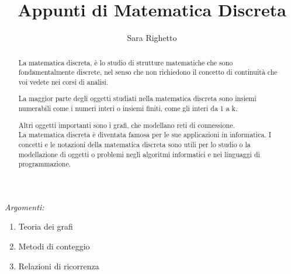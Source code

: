 \documentclass[12pt,a4paper]{article}
\begin{document}
    \author{Sara Righetto}
    \title{Appunti di Matematica Discreta}

    \maketitle

    \newpage
    \tableofcontents %

    \newpage

    \begin{abstract} 
        La matematica discreta, è lo studio di strutture matematiche che sono fondamentalmente discrete, nel senso che non
    richiedono il concetto di continuità che voi vedete nei corsi di analisi. \par
    La maggior parte degli oggetti studiati nella matematica discreta sono insiemi numerabili come i numeri interi o
    insiemi finiti, come gli interi da 1 a k. \par
    Altri oggetti importanti sono i grafi, che modellano reti di connessione. \\

        La matematica discreta è diventata famosa per le sue applicazioni in informatica. I concetti e le notazioni della matematica discreta sono utili per lo studio o la modellazione di oggetti o problemi negli algoritmi informatici e nei linguaggi di programmazione.
    \end{abstract}

\begin{center}
    \textit{Argomenti:}
    \begin{enumerate}
        \item Teoria dei grafi 
        \item Metodi di conteggio
        \item Relazioni di ricorrenza
    \end{enumerate}
\end{center}

    \newpage









\end{document}
